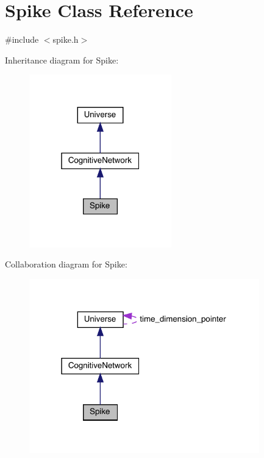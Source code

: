 \hypertarget{class_spike}{}\section{Spike Class Reference}
\label{class_spike}


{\ttfamily \#include $<$spike.\+h$>$}



Inheritance diagram for Spike\+:\nopagebreak
\begin{figure}[H]
\begin{center}
\leavevmode
\includegraphics[width=175pt]{class_spike__inherit__graph}
\end{center}
\end{figure}


Collaboration diagram for Spike\+:
\nopagebreak
\begin{figure}[H]
\begin{center}
\leavevmode
\includegraphics[width=283pt]{class_spike__coll__graph}
\end{center}
\end{figure}

